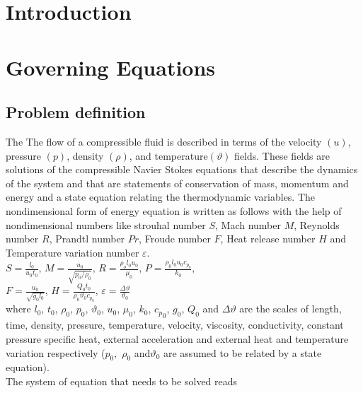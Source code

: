 \documentclass[11pt,a4paper]{article}
\begin{document}
\section{Introduction}
\section{Governing Equations}
\subsection{Problem definition}
The The flow of a compressible fluid is described in terms of the velocity $(u)$, pressure $(p)$, density $(\rho)$, and temperature$(\vartheta)$ fields. These fields are solutions of the compressible Navier Stokes equations that describe the dynamics of the system
and that are statements of conservation of mass, momentum and energy and a state equation relating the thermodynamic variables. The nondimensional form of energy equation is written as follows with the help of nondimensional numbers like strouhal number $S$, Mach number $M$, Reynolds number $R$, Prandtl number $Pr$, Froude number $F$, Heat release number $H$ and Temperature variation number $\varepsilon$. \\
$S=\frac{l_0}{u_0t_0}$,  $M=\frac{u_0}{\sqrt{p_0/\rho_0}}$, $R=\frac{\rho_ol_0u_0}{\mu_0}$, $P=\frac{\rho_0l_0u_0c_{p_0}}{k_0}$, \\ $F=\frac{u_0}{\sqrt{g_0l_0}}$, $H=\frac{Q_0t_0}{\rho_0\vartheta_0c_{p_0}}$, $\varepsilon=\frac{{\Delta}\vartheta}{\vartheta_0}$\\
where $l_0$, $t_0$, $\rho_0$, $p_0$, $\vartheta_0$, $u_0$, $\mu_0$, $k_0$, ${c_p}_0$, $g_0$, $Q_0$ and $\Delta\vartheta$ are the scales of length,
time, density, pressure, temperature, velocity, viscosity, conductivity, constant
pressure specific heat, external acceleration and external heat and temperature
variation respectively ($p_0,$ $\rho_0$ and$ \vartheta_0$ are assumed to be related by a state
equation).\\
The system of equation that needs to be solved reads
\end{document}

